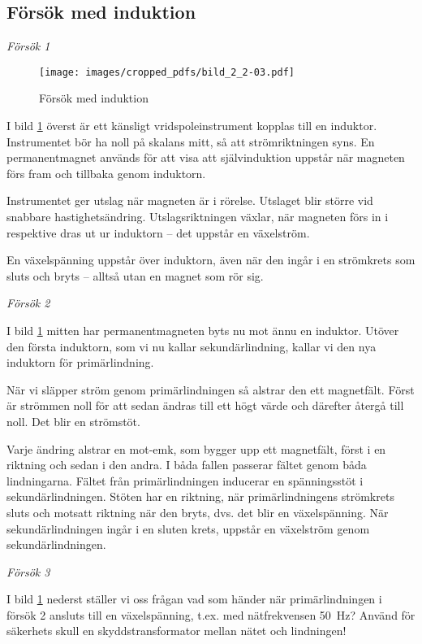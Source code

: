 \subsection{Försök med induktion}

\emph{Försök 1}

\begin{figure}
\texttt{[image: images/cropped\_pdfs/bild\_2\_2-03.pdf]}
\caption{Försök med induktion}
\label{fig:BildII2-3}
\end{figure}

I bild \ref{fig:BildII2-3} överst är ett känsligt vridspoleinstrument kopplas
till en induktor.
Instrumentet bör ha noll på skalans mitt, så att strömriktningen syns.
En permanentmagnet används för att visa att självinduktion uppstår när
magneten förs fram och tillbaka genom induktorn.

Instrumentet ger utslag när magneten är i rörelse. Utslaget blir större vid
snabbare hastighetsändring. Utslagsriktningen växlar, när magneten förs in i
respektive dras ut ur induktorn -- det uppstår en växelström.

En växelspänning uppstår över induktorn, även när den ingår i en strömkrets som
sluts och bryts -- alltså utan en magnet som rör sig.

\emph{Försök 2}

I bild \ref{fig:BildII2-3} mitten har permanentmagneten byts nu mot ännu en
induktor.
Utöver den första induktorn, som vi nu kallar sekundärlindning, kallar vi den
nya induktorn för primärlindning.

När vi släpper ström genom primärlindningen så alstrar den ett magnetfält.
Först är strömmen noll för att sedan ändras till ett högt värde och därefter
återgå till noll. Det blir en strömstöt.

Varje ändring alstrar en mot-emk, som bygger upp ett magnetfält, först i en
riktning och sedan i den andra. I båda fallen passerar fältet genom båda
lindningarna. Fältet från primärlindningen inducerar en spänningsstöt i
sekundärlindningen. Stöten har en riktning, när primärlindningens strömkrets
sluts och motsatt riktning när den bryts, dvs. det blir en växelspänning.
När sekundärlindningen ingår i en sluten krets, uppstår en växelström genom
sekundärlindningen.

\emph{Försök 3}

I bild \ref{fig:BildII2-3} nederst ställer vi oss frågan vad som händer när
primärlindningen i försök 2 ansluts till en växelspänning, t.ex.
med nätfrekvensen 50~Hz? Använd för säkerhets skull en skyddstransformator
mellan nätet och lindningen!

